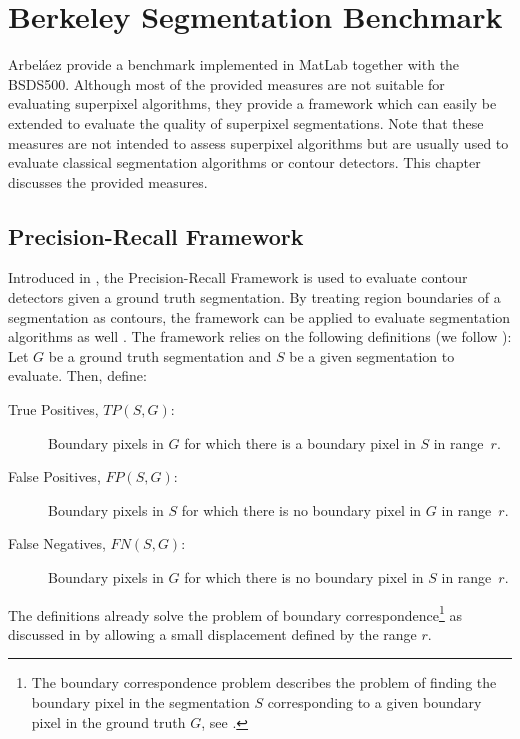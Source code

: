 \chapter{Berkeley Segmentation Benchmark}
\label{chapter:appendix-berkeley-segmentation-benchmark}

Arbel\'aez \etal \cite{ArbelaezMaireFowlkesMalik:2011} provide a benchmark implemented in MatLab together with the BSDS500. Although most of the provided measures are not suitable for evaluating superpixel algorithms, they provide a framework which can easily be extended to evaluate the quality of superpixel segmentations. Note that these measures are not intended to assess superpixel algorithms but are usually used to evaluate classical segmentation algorithms or contour detectors. This chapter discusses the provided measures.

\section{Precision-Recall Framework}
\label{section:appendix-berkeley-segmentation-benchmark-recall}

Introduced in \cite{MartinFowlkesMalik:2004}, the Precision-Recall Framework is used to evaluate contour detectors given a ground truth segmentation. By treating region boundaries of a segmentation as contours, the framework can be applied to evaluate segmentation algorithms as well \cite{ArbelaezMaireFowlkesMalik:2011}. The framework relies on the following definitions (we follow \cite{NeubertProtzel:2012}): Let $G$ be a ground truth segmentation and $S$ be a given segmentation to evaluate. Then, define:
\begin{description}
 	\item[True Positives, $TP(S, G)$:] Boundary pixels in $G$ for which there is a boundary pixel in $S$ in range~$r$.
 	\item[False Positives, $FP(S, G)$:] Boundary pixels in $S$ for which there is no boundary pixel in $G$ in range~$r$.
	\item[False Negatives, $FN(S, G)$:] Boundary pixels in $G$ for which there is no boundary pixel in $S$ in range~$r$.
\end{description}
The definitions already solve the problem of boundary correspondence\footnote{The boundary correspondence problem describes the problem of finding the boundary pixel in the segmentation $S$ corresponding to a given boundary pixel in the ground truth $G$, see \cite{MartinFowlkesMalik:2004}.} as discussed in \cite{MartinFowlkesMalik:2004} by allowing a small displacement defined by the range $r$.

